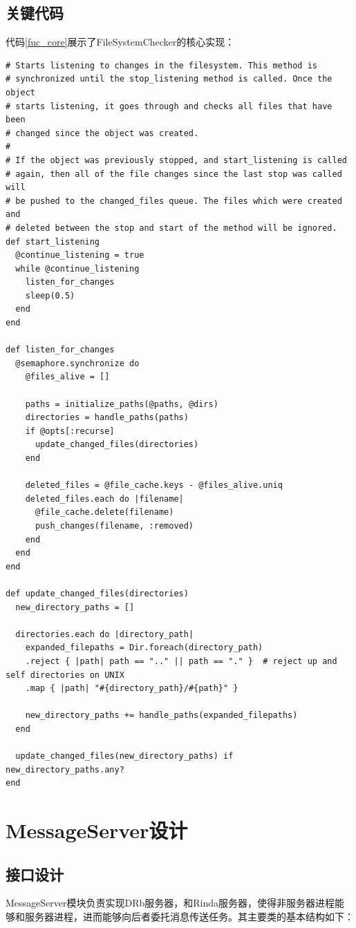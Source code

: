 \subsection{关键代码}
代码\ref{fuc_core}展示了FileSystemChecker的核心实现：
\begin{lstlisting}[caption={FileSystemChecker核心代码展示}, label=fuc_core]
# Starts listening to changes in the filesystem. This method is
# synchronized until the stop_listening method is called. Once the object
# starts listening, it goes through and checks all files that have been
# changed since the object was created.
#
# If the object was previously stopped, and start_listening is called
# again, then all of the file changes since the last stop was called will
# be pushed to the changed_files queue. The files which were created and
# deleted between the stop and start of the method will be ignored.
def start_listening
  @continue_listening = true
  while @continue_listening
    listen_for_changes
    sleep(0.5)
  end
end

def listen_for_changes
  @semaphore.synchronize do
    @files_alive = []

    paths = initialize_paths(@paths, @dirs)
    directories = handle_paths(paths)
    if @opts[:recurse]
      update_changed_files(directories)
    end

    deleted_files = @file_cache.keys - @files_alive.uniq
    deleted_files.each do |filename|
      @file_cache.delete(filename)
      push_changes(filename, :removed)
    end
  end
end

def update_changed_files(directories)
  new_directory_paths = []

  directories.each do |directory_path|
    expanded_filepaths = Dir.foreach(directory_path)
    .reject { |path| path == ".." || path == "." }  # reject up and self directories on UNIX
    .map { |path| "#{directory_path}/#{path}" }

    new_directory_paths += handle_paths(expanded_filepaths)
  end

  update_changed_files(new_directory_paths) if new_directory_paths.any?
end
\end{lstlisting}

\section{MessageServer设计}
\subsection{接口设计}
MessageServer模块负责实现DRb服务器，和Rinda服务器，使得非服务器进程能够和服务器进程，进而能够向后者委托消息传送任务。其主要类的基本结构如下：

